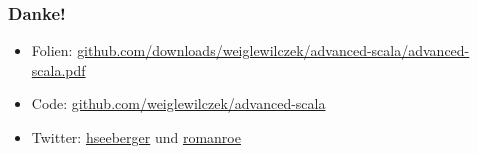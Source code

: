 \documentclass{beamer}
\begin{document}

\begin{frame}
  \frametitle{Danke!}
  \begin{itemize}
    \item Folien: \href{https://github.com/downloads/weiglewilczek/advanced-scala/advanced-scala.pdf}{github.com/downloads/weiglewilczek/advanced-scala/advanced-scala.pdf}
    \item Code: \href{https://github.com/weiglewilczek/advanced-scala}{github.com/weiglewilczek/advanced-scala}
    \item Twitter: \href{http://twitter.com/hseeberger}{hseeberger} und \href{http://twitter.com/romanroe}{romanroe}
  \end{itemize}
\end{frame}
\end{document}
